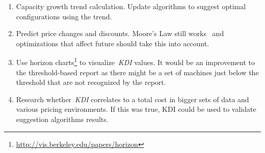 \documentclass[]{final_report}
\begin{document}
\begin{enumerate}
\item Capacity growth trend calculation. Update algorithms to suggest optimal configurations using the trend. 
\item Predict price changes and discounts. Moore's Law still works~\cite{7057609} and optimizations that affect future should take this into account.
\item Use horizon charts\footnote{\url{http://vis.berkeley.edu/papers/horizon}} to visualize~\textit{KDI} values. It would be an improvement to the threshold-based report as there might be a set of machines just below the threshold that are not recognized by the report.
\item Research whether~\textit{KDI} correlates to a total cost in bigger sets of data and various pricing environments. If this was true, KDI could be used to validate suggestion algorithms results. 



\end{enumerate}


\newpage

\label{endpage}
{}

\end{document}
